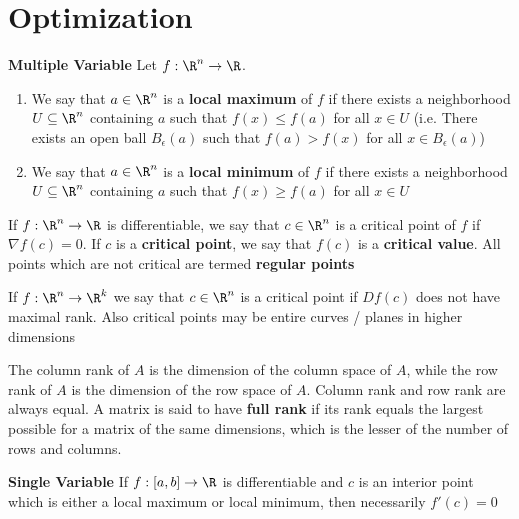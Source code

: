 \documentclass[11pt]{article}
\begin{document}
\section{Optimization}


\begin{defn*}
  \textbf{Multiple Variable} Let $f: \R^n \to \R$.
  \begin{enumerate}
    \item We say that $a\in\R^n$ is a \textbf{local maximum} of $f$ if there exists a neighborhood $U\subseteq \R^n$ containing $a$ such that $f(x) \leq f(a)$ for all $x\in U$ (i.e. There exists an open ball $B_{\epsilon}(a)$ such that $f(a) > f(x)$ for all $x\in B_{\epsilon}(a)$)
    \item We say that $a\in\R^n$ is a \textbf{local minimum} of $f$ if there exists a neighborhood $U\subseteq \R^n$ containing $a$ such that $f(x) \geq f(a)$ for all $x\in U$
  \end{enumerate}
\end{defn*}


\begin{defn*}
  If $f:\R^n \to \R$ is differentiable, we say that $c\in \R^n$ is a critical point of $f$ if $\nabla f(c) = 0$. If $c$ is a \textbf{critical point}, we say that $f(c)$ is a \textbf{critical value}. All points which are not critical are termed \textbf{regular points}
  \begin{rem}
    If $f: \R^n \to \R^k$ we say that $c\in \R^n$ is a critical point if $Df(c)$ does not have maximal rank. Also critical points may be entire curves / planes in higher dimensions
  \end{rem}
\end{defn*}

\begin{defn*}
  The column rank of $A$ is the dimension of the column space of $A$, while the row rank of $A$ is the dimension of the row space of $A$. Column rank and row rank are always equal. A matrix is said to have \textbf{full rank} if its rank equals the largest possible for a matrix of the same dimensions, which is the lesser of the number of rows and columns.
\end{defn*}

\begin{proposition*}
  \textbf{Single Variable} If $f: [a,b]\to \R$ is differentiable and $c$ is an interior point which is either a local maximum or local minimum, then necessarily $f'(c) = 0$
\end{proposition*}
\end{document}
